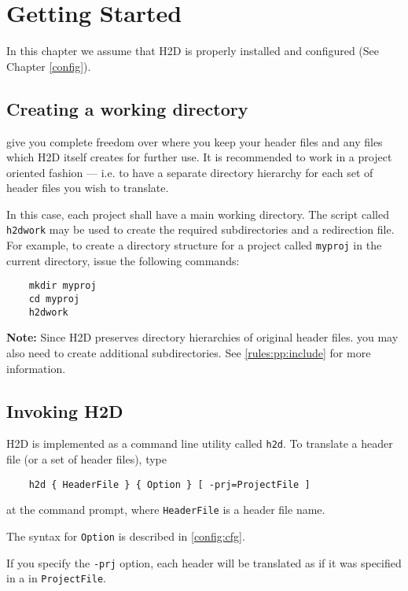 \chapter{Getting Started}
\label{start}

In this chapter we assume that H2D is properly installed and configured
(See Chapter \ref{config}).

\section{Creating a working directory}
\label{start:dirs}

 give you complete freedom
over where you keep your header files and any files which H2D
itself creates for further use. It is recommended to work in a project
oriented fashion --- i.e. to have a separate directory
hierarchy for each set of header files you wish to translate.

In this case, each project shall have a main working directory.
The script called {\tt h2dwork} may be used to create the required
subdirectories and a redirection file. For example,
to create a directory structure for a project called {\tt myproj}
in the current directory, issue the following commands:

\verb'    mkdir myproj'\\
\verb'    cd myproj'\\
\verb'    h2dwork'

{\bf Note:} Since H2D preserves directory hierarchies of original
header files. you may also need to create additional subdirectories.
See \ref{rules:pp:include} for more information.

\section{Invoking H2D}
\label{start:invoking}

H2D is implemented as a command line utility called \verb'h2d'.
To translate a header file (or a set of header files), type

\verb'    h2d { HeaderFile } { Option } [ -prj=ProjectFile ] '

at the command prompt, where \verb'HeaderFile' is a header
file name.

The syntax for \verb'Option' is described in \ref{config:cfg}.

If you specify the \verb'-prj' option, each header will be translated
as if it was specified in a  in \verb'ProjectFile'.

